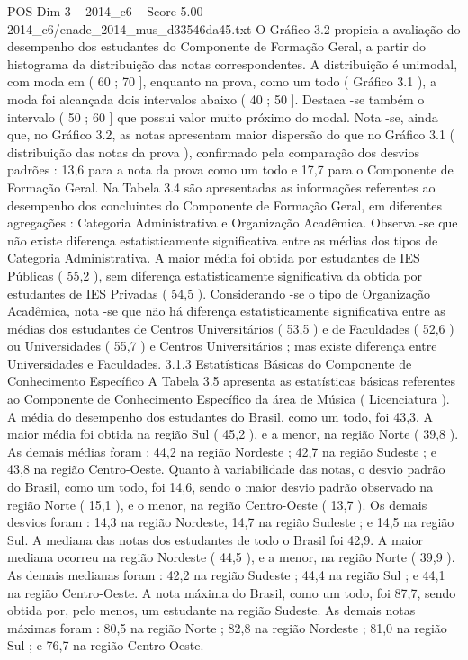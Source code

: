 \begin{textsample}{POS Dim 3 – 2014\_c6 – Score 5.00 – 2014\_c6/enade\_2014\_mus\_d33546da45.txt}
O Gráfico 3.2 propicia a avaliação do desempenho dos estudantes do Componente de Formação Geral, a partir do histograma da distribuição das notas correspondentes.
A distribuição é unimodal, com moda em ( 60 ; 70 ], enquanto na prova, como um todo ( Gráfico 3.1 ), a moda foi alcançada dois intervalos abaixo ( 40 ; 50 ].
Destaca -se também o intervalo ( 50 ; 60 ] que possui valor muito próximo do modal.
Nota -se, ainda que, no Gráfico 3.2, as notas apresentam maior dispersão do que no Gráfico 3.1 ( distribuição das notas da prova ), confirmado pela comparação dos desvios padrões : 13,6 para a nota da prova como um todo e 17,7 para o Componente de Formação Geral.
Na Tabela 3.4 são apresentadas as informações referentes ao desempenho dos concluintes do Componente de Formação Geral, em diferentes agregações : Categoria Administrativa e Organização Acadêmica.
Observa -se que não existe diferença estatisticamente significativa entre as médias dos tipos de Categoria Administrativa.
A maior média foi obtida por estudantes de IES Públicas ( 55,2 ), sem diferença estatisticamente significativa da obtida por estudantes de IES Privadas ( 54,5 ).
Considerando -se o tipo de Organização Acadêmica, nota -se que não há diferença estatisticamente significativa entre as médias dos estudantes de Centros Universitários ( 53,5 ) e de Faculdades ( 52,6 ) ou Universidades ( 55,7 ) e Centros Universitários ; mas existe diferença entre Universidades e Faculdades. 3.1.3 Estatísticas Básicas do Componente de Conhecimento Específico A Tabela 3.5 apresenta as estatísticas básicas referentes ao Componente de Conhecimento Específico da área de Música ( Licenciatura ).
A média do desempenho dos estudantes do Brasil, como um todo, foi 43,3.
A maior média foi obtida na região Sul ( 45,2 ), e a menor, na região Norte ( 39,8 ).
As demais médias foram : 44,2 na região Nordeste ; 42,7 na região Sudeste ; e 43,8 na região Centro-Oeste.
Quanto à variabilidade das notas, o desvio padrão do Brasil, como um todo, foi 14,6, sendo o maior desvio padrão observado na região Norte ( 15,1 ), e o menor, na região Centro-Oeste ( 13,7 ).
Os demais desvios foram : 14,3 na região Nordeste, 14,7 na região Sudeste ; e 14,5 na região Sul.
A mediana das notas dos estudantes de todo o Brasil foi 42,9.
A maior mediana ocorreu na região Nordeste ( 44,5 ), e a menor, na região Norte ( 39,9 ).
As demais medianas foram : 42,2 na região Sudeste ; 44,4 na região Sul ; e 44,1 na região Centro-Oeste.
A nota máxima do Brasil, como um todo, foi 87,7, sendo obtida por, pelo menos, um estudante na região Sudeste.
As demais notas máximas foram : 80,5 na região Norte ; 82,8 na região Nordeste ; 81,0 na região Sul ; e 76,7 na região Centro-Oeste.

\end{textsample}

